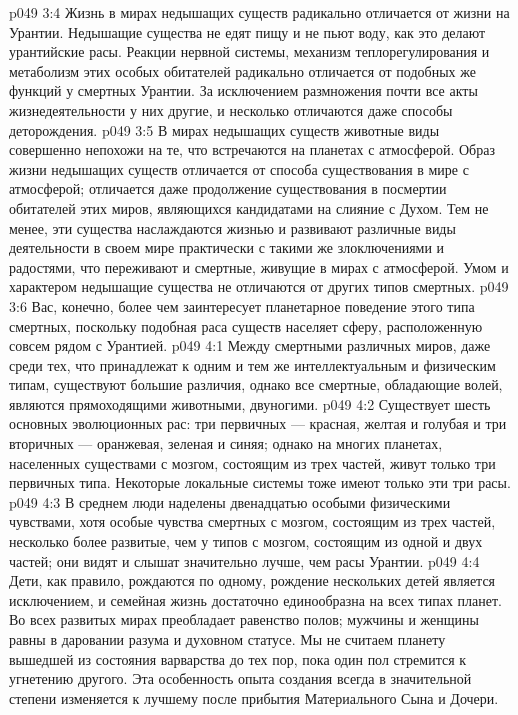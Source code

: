 \vs p049 3:4 Жизнь в мирах недышащих существ радикально отличается от жизни на Урантии. Недышащие существа не едят пищу и не пьют воду, как это делают урантийские расы. Реакции нервной системы, механизм теплорегулирования и метаболизм этих особых обитателей радикально отличается от подобных же функций у смертных Урантии. За исключением размножения почти все акты жизнедеятельности у них другие, и несколько отличаются даже способы деторождения.
\vs p049 3:5 В мирах недышащих существ животные виды совершенно непохожи на те, что встречаются на планетах с атмосферой. Образ жизни недышащих существ отличается от способа существования в мире с атмосферой; отличается даже продолжение существования в посмертии обитателей этих миров, являющихся кандидатами на слияние с Духом. Тем не менее, эти существа наслаждаются жизнью и развивают различные виды деятельности в своем мире практически с такими же злоключениями и радостями, что переживают и смертные, живущие в мирах с атмосферой. Умом и характером недышащие существа не отличаются от других типов смертных.
\vs p049 3:6 Вас, конечно, более чем заинтересует планетарное поведение этого типа смертных, поскольку подобная раса существ населяет сферу, расположенную совсем рядом с Урантией.
\vs p049 4:1 Между смертными различных миров, даже среди тех, что принадлежат к одним и тем же интеллектуальным и физическим типам, существуют большие различия, однако все смертные, обладающие волей, являются прямоходящими животными, двуногими.
\vs p049 4:2 Существует шесть основных эволюционных рас: три первичных --- красная, желтая и голубая и три вторичных --- оранжевая, зеленая и синяя; однако на многих планетах, населенных существами с мозгом, состоящим из трех частей, живут только три первичных типа. Некоторые локальные системы тоже имеют только эти три расы.
\vs p049 4:3 В среднем люди наделены двенадцатью особыми физическими чувствами, хотя особые чувства смертных с мозгом, состоящим из трех частей, несколько более развитые, чем у типов с мозгом, состоящим из одной и двух частей; они видят и слышат значительно лучше, чем расы Урантии.
\vs p049 4:4 Дети, как правило, рождаются по одному, рождение нескольких детей является исключением, и семейная жизнь достаточно единообразна на всех типах планет. Во всех развитых мирах преобладает равенство полов; мужчины и женщины равны в даровании разума и духовном статусе. Мы не считаем планету вышедшей из состояния варварства до тех пор, пока один пол стремится к угнетению другого. Эта особенность опыта создания всегда в значительной степени изменяется к лучшему после прибытия Материального Сына и Дочери.
